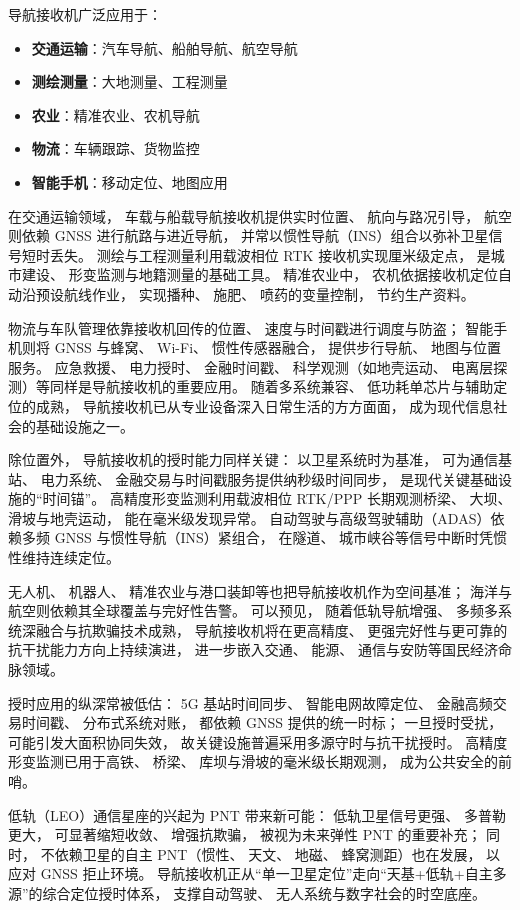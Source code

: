 导航接收机广泛应用于：

\begin{itemize}
    \item \textbf{交通运输}：汽车导航、船舶导航、航空导航
    \item \textbf{测绘测量}：大地测量、工程测量
    \item \textbf{农业}：精准农业、农机导航
    \item \textbf{物流}：车辆跟踪、货物监控
    \item \textbf{智能手机}：移动定位、地图应用
\end{itemize}

在交通运输领域，
车载与船载导航接收机提供实时位置、
航向与路况引导，
航空则依赖 GNSS 进行航路与进近导航，
并常以惯性导航（INS）组合以弥补卫星信号短时丢失。
测绘与工程测量利用载波相位 RTK 接收机实现厘米级定点，
是城市建设、
形变监测与地籍测量的基础工具。
精准农业中，
农机依据接收机定位自动沿预设航线作业，
实现播种、
施肥、
喷药的变量控制，
节约生产资料。

物流与车队管理依靠接收机回传的位置、
速度与时间戳进行调度与防盗；
智能手机则将 GNSS 与蜂窝、
Wi-Fi、
惯性传感器融合，
提供步行导航、
地图与位置服务。
应急救援、
电力授时、
金融时间戳、
科学观测（如地壳运动、
电离层探测）等同样是导航接收机的重要应用。
随着多系统兼容、
低功耗单芯片与辅助定位的成熟，
导航接收机已从专业设备深入日常生活的方方面面，
成为现代信息社会的基础设施之一。

除位置外，
导航接收机的授时能力同样关键：
以卫星系统时为基准，
可为通信基站、
电力系统、
金融交易与时间戳服务提供纳秒级时间同步，
是现代关键基础设施的“时间锚”。
高精度形变监测利用载波相位 RTK/PPP 长期观测桥梁、
大坝、
滑坡与地壳运动，
能在毫米级发现异常。
自动驾驶与高级驾驶辅助（ADAS）依赖多频 GNSS 与惯性导航（INS）紧组合，
在隧道、
城市峡谷等信号中断时凭惯性维持连续定位。

无人机、
机器人、
精准农业与港口装卸等也把导航接收机作为空间基准；
海洋与航空则依赖其全球覆盖与完好性告警。
可以预见，
随着低轨导航增强、
多频多系统深融合与抗欺骗技术成熟，
导航接收机将在更高精度、
更强完好性与更可靠的抗干扰能力方向上持续演进，
进一步嵌入交通、
能源、
通信与安防等国民经济命脉领域。

授时应用的纵深常被低估：
5G 基站时间同步、
智能电网故障定位、
金融高频交易时间戳、
分布式系统对账，
都依赖 GNSS 提供的统一时标；
一旦授时受扰，
可能引发大面积协同失效，
故关键设施普遍采用多源守时与抗干扰授时。
高精度形变监测已用于高铁、
桥梁、
库坝与滑坡的毫米级长期观测，
成为公共安全的前哨。

低轨（LEO）通信星座的兴起为 PNT 带来新可能：
低轨卫星信号更强、
多普勒更大，
可显著缩短收敛、
增强抗欺骗，
被视为未来弹性 PNT 的重要补充；
同时，
不依赖卫星的自主 PNT（惯性、
天文、
地磁、
蜂窝测距）也在发展，
以应对 GNSS 拒止环境。
导航接收机正从“单一卫星定位”走向“天基+低轨+自主多源”的综合定位授时体系，
支撑自动驾驶、
无人系统与数字社会的时空底座。
